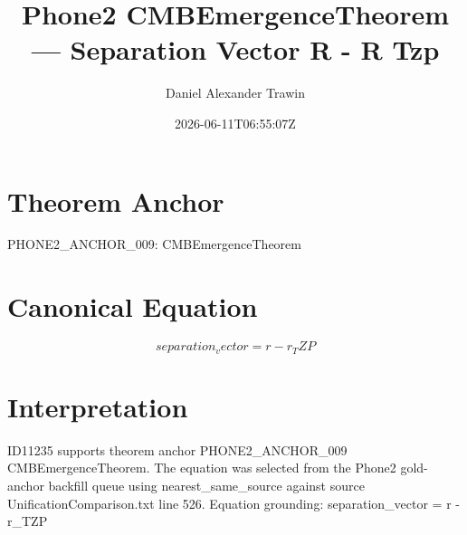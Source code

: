 \documentclass[11pt]{article}
\title{Phone2 CMBEmergenceTheorem — Separation Vector R - R Tzp}
\author{Daniel Alexander Trawin}
\date{2026-06-11T06:55:07Z}
\begin{document}
\maketitle
\section*{Theorem Anchor}
PHONE2_ANCHOR_009: CMBEmergenceTheorem
\section*{Canonical Equation}
\[
separation_vector = r - r_TZP
\]
\section*{Interpretation}
ID11235 supports theorem anchor PHONE2_ANCHOR_009 CMBEmergenceTheorem. The equation was selected from the Phone2 gold-anchor backfill queue using nearest_same_source against source UnificationComparison.txt line 526. Equation grounding: separation_vector = r - r_TZP
\end{document}
